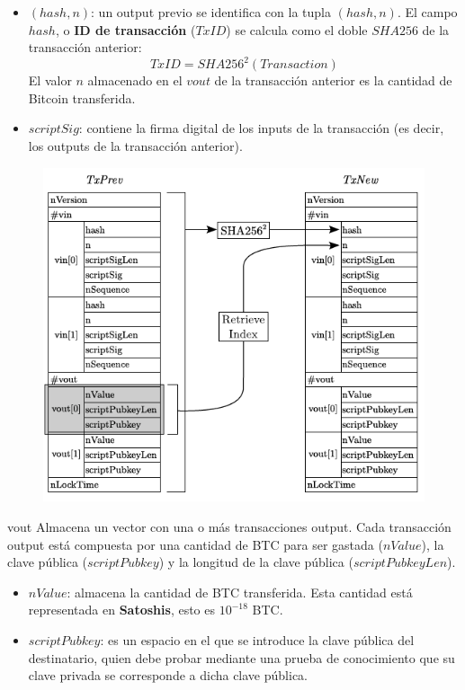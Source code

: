 \documentclass{beamer}
\theoremstyle{definition}
\begin{document}
\begin{frame}
\begin{itemize}
	\item<1-> $(hash,n)$: un output previo se identifica con la tupla $(hash,n)$. El campo $hash$, o \textbf{ID de transacción} ($TxID$) se calcula como el doble $SHA256$ de la transacción anterior: $$TxID=SHA256^2(Transaction)$$
	El valor $n$ almacenado en el $vout$ de la transacción anterior es la cantidad de Bitcoin transferida.
	
		\item<2-> $scriptSig$: contiene la firma digital de los inputs de la transacción (es decir, los outputs de la transacción anterior).
		
	
\end{itemize}
\end{frame}

\begin{frame}
	\begin{figure}
		\includegraphics[scale=0.5]{hash}
	\end{figure}
\end{frame}


\begin{frame}
	\begin{block}{vout}
		Almacena un vector con una o más transacciones output. Cada transacción output está compuesta por una cantidad de BTC para ser gastada ($nValue$), la clave pública ($scriptPubkey$) y la longitud de la clave pública ($scriptPubkeyLen$).
	\end{block}
\begin{itemize}
	\item<2-> $nValue$: almacena la cantidad de BTC transferida. Esta cantidad está representada en \textbf{Satoshis}, esto es $10^{-18}$ BTC.
	\item<3->$scriptPubkey$: es un espacio en el que se introduce la clave pública del destinatario, quien debe probar mediante una prueba de conocimiento que su clave privada se corresponde a dicha clave pública.
\end{itemize}
	
\end{frame}
\end{document}
